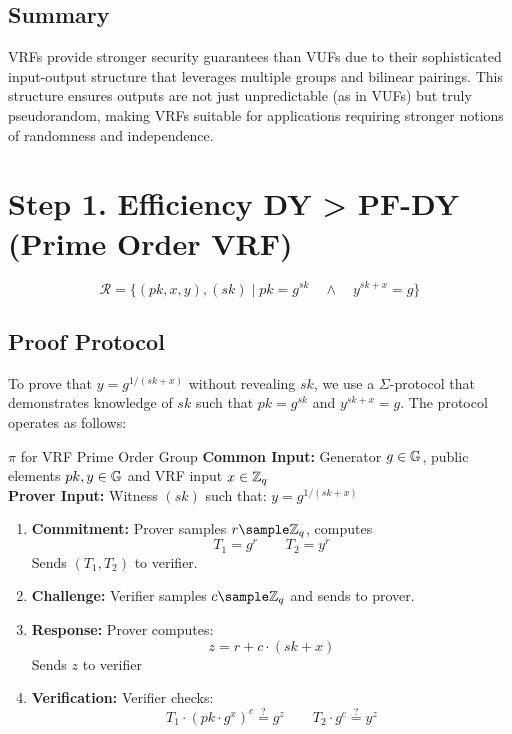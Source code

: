 \subsection{Summary}
VRFs provide stronger security guarantees than VUFs due to their sophisticated input-output structure that leverages multiple groups and bilinear pairings. This structure ensures outputs are not just unpredictable (as in VUFs) but truly pseudorandom, making VRFs suitable for applications requiring stronger notions of randomness and independence.


















\newpage
\section{Step 1. Efficiency DY > PF-DY (Prime Order VRF)}
\[
\mathcal{R} = \{(pk, x, y), (sk) \mid pk = g^{sk} \quad \wedge \quad y^{sk+x} = g\}
\]


\subsection{Proof Protocol}
To prove that $y = g^{1/(sk+x)}$ without revealing $sk$, we use a $\Sigma$-protocol that demonstrates knowledge of $sk$ such that $pk = g^{sk}$ and $y^{sk+x} = g$. The protocol operates as follows:

\begin{protocol}{$\pi$ for VRF Prime Order Group}{}\label{pok-vrf-prime-order-group}
\textbf{Common Input:} Generator $g \in \mathbb{G}$, public elements $pk, y \in \mathbb{G}$ and VRF input $x \in \mathbb{Z}_q$\\
\textbf{Prover Input:} Witness $(sk)$ such that: $y = g^{1/(sk + x)}$
\begin{enumerate}
    \item \textbf{Commitment:} Prover samples $r \sample \Z_q$, computes 
    \[
    T_1 = g^r \qquad T_2 = y^r
    \]
    Sends $(T_1, T_2)$ to verifier.
    
    \item \textbf{Challenge:} Verifier samples $c \sample \mathbb{Z}_q$ and sends to prover.
    
    \item \textbf{Response:} Prover computes:
    \[
    z = r + c \cdot (sk + x)
    \]
    Sends $z$ to verifier
    
    \item \textbf{Verification:} Verifier checks:
    \[
    T_1 \cdot (pk \cdot g^x)^c \stackrel{?}{=} g^z \qquad T_2 \cdot g^c \stackrel{?}{=} y^z
    \]
 
\end{enumerate}
\end{protocol}









